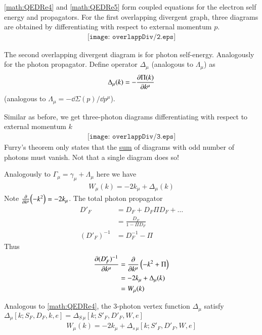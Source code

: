 \ref{math:QEDRe4} and \ref{math:QEDRe5} form coupled equations for the electron self energy and propagators. For the first overlapping divergent graph, three diagrams are obtained by differentiating with respect to external momentum $p$.
\begin{align*}
   \texttt{[image: overlappDiv/2.eps]}
\end{align*}

The second overlapping divergent diagram is for photon self-energy. Analogously for the photon propagator. Define operator $\Delta_\mu$ (analogous to $\Lambda_\mu$) as 
\begin{align}
   \Delta_\mu (k) = - \pdv{\Pi(k)}{k^\mu} \label{math:QEDRe6}
\end{align}
(analogous to $\Lambda_\mu = - \dd \Sigma(p) / \dd  p^\mu$).

Similar as before, we get three-photon diagrams differentiating with respect to external momentum $k$
\begin{align*}
   \texttt{[image: overlappDiv/3.eps]}
\end{align*}
Furry's theorem only states that the \underline{sum} of diagrams with odd number of photons must vanish. Not that a single diagram does so!

Analogously to $\Gamma_\mu = \gamma_\mu + \Lambda_\mu$ here we have
\begin{align}
   W_\mu (k) = -2k_\mu + \Delta_\mu (k) \label{math:QEDRe7}
\end{align}
Note $\pdv{k^\mu} (-k^2) = -2 k_\mu$.
The total photon propagator
\begin{align*}
   D'_F &= D_F + D_F \Pi D_F + \dots \\
        &= \frac{D_F}{1- \Pi D_F} \\
   (D'_F)^{-1} &= D_F^{-1} - \Pi
\end{align*}
Thus 
\begin{align}
   \begin{split}
      \pdv{(D'_F)^{-1}}{k^\mu} &= \pdv{k^\mu} \left( -k^2 + \Pi \right) \\
                               &= -2 k_\mu + \Delta_\mu (k) \\
                               &= W_\mu (k) 
   \end{split}\label{math:QEDRe8}
\end{align}

Analogous to \ref{math:QEDRe4}, the 3-photon vertex function $\Delta_\mu$ satisfy $\Delta_\mu [k; S_F, D_F, k, e]  = \Delta_{S \, \mu} [k; S'_F, D'_F, W, e] $
\begin{align}
   W_\mu (k) = -2 k_\mu + \Delta_{s \, \mu} [k; S'_F, D'_F, W, e]  \label{math:QEDRe9}
\end{align}

